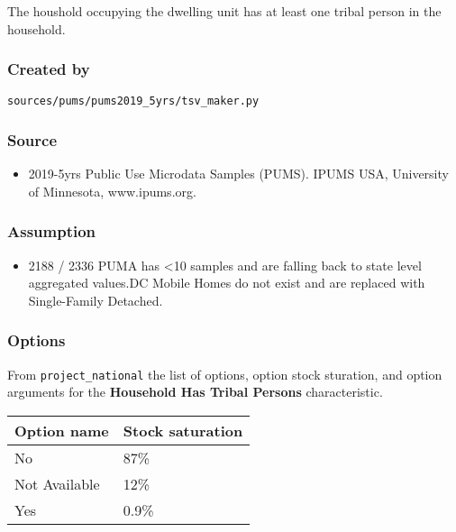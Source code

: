 The houshold occupying the dwelling unit has at least one tribal person
in the household.

\subsubsection{Created by}\label{created-by-94}

\texttt{sources/pums/pums2019\_5yrs/tsv\_maker.py}

\subsubsection{Source}\label{source-93}

\begin{itemize}
 
\item
  2019-5yrs Public Use Microdata Samples (PUMS). IPUMS USA, University
  of Minnesota, www.ipums.org.
\end{itemize}

\subsubsection{Assumption}\label{assumption-56}

\begin{itemize}
 
\item
  2188 / 2336 PUMA has \textless10 samples and are falling back to state
  level aggregated values.DC Mobile Homes do not exist and are replaced
  with Single-Family Detached.
\end{itemize}

\subsubsection{Options}\label{options-94}

From \texttt{project\_national} the list of options, option stock
sturation, and option arguments for the \textbf{Household Has Tribal
Persons} characteristic.

\begin{longtable}[]{@{}ll@{}}
\toprule\noalign{}
Option name & Stock saturation \\
\midrule\noalign{}
\endhead
\bottomrule\noalign{}
\endlastfoot
No & 87\% \\
Not Available & 12\% \\
Yes & 0.9\% \\
\end{longtable}


